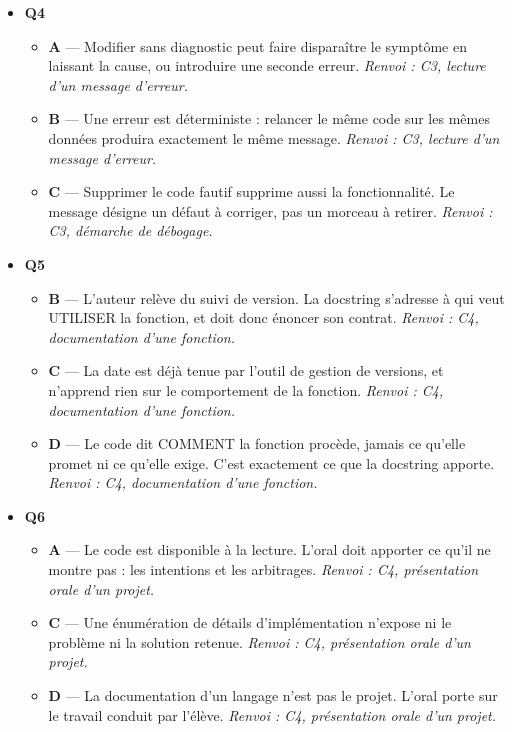 \begin{itemize}
\begin{itemize}
    \item \textbf{D} — Les jalons découpent le cahier des charges dans le temps ; ils le supposent donc écrit, loin de le remplacer. \emph{Renvoi : C2, cahier des charges et jalons.}
  \end{itemize}
  \item \textbf{Q4}
  \begin{itemize}
    \item \textbf{A} — Modifier sans diagnostic peut faire disparaître le symptôme en laissant la cause, ou introduire une seconde erreur. \emph{Renvoi : C3, lecture d'un message d'erreur.}
    \item \textbf{B} — Une erreur est déterministe : relancer le même code sur les mêmes données produira exactement le même message. \emph{Renvoi : C3, lecture d'un message d'erreur.}
    \item \textbf{C} — Supprimer le code fautif supprime aussi la fonctionnalité. Le message désigne un défaut à corriger, pas un morceau à retirer. \emph{Renvoi : C3, démarche de débogage.}
  \end{itemize}
  \item \textbf{Q5}
  \begin{itemize}
    \item \textbf{B} — L'auteur relève du suivi de version. La docstring s'adresse à qui veut UTILISER la fonction, et doit donc énoncer son contrat. \emph{Renvoi : C4, documentation d'une fonction.}
    \item \textbf{C} — La date est déjà tenue par l'outil de gestion de versions, et n'apprend rien sur le comportement de la fonction. \emph{Renvoi : C4, documentation d'une fonction.}
    \item \textbf{D} — Le code dit COMMENT la fonction procède, jamais ce qu'elle promet ni ce qu'elle exige. C'est exactement ce que la docstring apporte. \emph{Renvoi : C4, documentation d'une fonction.}
  \end{itemize}
  \item \textbf{Q6}
  \begin{itemize}
    \item \textbf{A} — Le code est disponible à la lecture. L'oral doit apporter ce qu'il ne montre pas : les intentions et les arbitrages. \emph{Renvoi : C4, présentation orale d'un projet.}
    \item \textbf{C} — Une énumération de détails d'implémentation n'expose ni le problème ni la solution retenue. \emph{Renvoi : C4, présentation orale d'un projet.}
    \item \textbf{D} — La documentation d'un langage n'est pas le projet. L'oral porte sur le travail conduit par l'élève. \emph{Renvoi : C4, présentation orale d'un projet.}
  \end{itemize}
\end{itemize}
\fi
